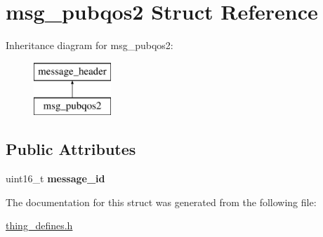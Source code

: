 \hypertarget{structmsg__pubqos2}{\section{msg\-\_\-pubqos2 Struct Reference}
\label{structmsg__pubqos2}
}
Inheritance diagram for msg\-\_\-pubqos2\-:\begin{figure}[H]
\begin{center}
\leavevmode
\includegraphics[height=2.000000cm]{structmsg__pubqos2}
\end{center}
\end{figure}
\subsection*{Public Attributes}
\begin{DoxyCompactItemize}
\item 
\hypertarget{structmsg__pubqos2_ae17a54c533fc396b23e990bae6feb48f}{uint16\-\_\-t {\bfseries message\-\_\-id}}\label{structmsg__pubqos2_ae17a54c533fc396b23e990bae6feb48f}

\end{DoxyCompactItemize}


The documentation for this struct was generated from the following file\-:\begin{DoxyCompactItemize}
\item 
\hyperlink{thing__defines_8h}{thing\-\_\-defines.\-h}\end{DoxyCompactItemize}
